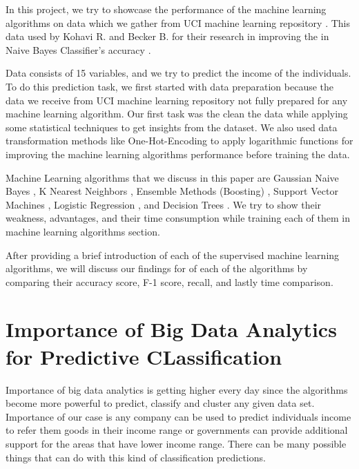 \documentclass[sigconf]{acmart}
\begin{document}
In this project, we try to showcase the performance of the machine learning algorithms on data which we gather from UCI machine learning repository \cite{www-uci}. This data used by Kohavi R. and Becker B. for their research in improving the in Naive Bayes Classifier's accuracy \cite{Kohavi:1996:SUA:3001460.3001502}. 
\par Data consists of 15 variables, and we try to predict the income of the individuals. To do this prediction task, we first started with data preparation because the data we receive from UCI machine learning repository \cite{www-uci} not fully prepared for any machine learning algorithm. Our first task was the clean the data while applying some statistical techniques to get insights from the dataset. We also used data transformation methods like One-Hot-Encoding\cite{www-hackernoon} to apply logarithmic functions for improving the machine learning algorithms performance before training the data. 
\par Machine Learning algorithms that we discuss in this paper are Gaussian Naive Bayes \cite{www-wikipedia-naivebayes}, K Nearest Neighbors \cite{Lee2017-knn}, Ensemble Methods (Boosting) \cite{dietterich-ensemble}, Support Vector Machines \cite{www-simafore-svm}, Logistic Regression \cite{adarsh}, and Decision Trees \cite{www-wikipedia.decision}. We try to show their weakness, advantages, and their time consumption while training each of them in machine learning algorithms section. 
\par After providing a brief introduction of each of the supervised machine learning algorithms, we will discuss our findings for of each of the algorithms by comparing their accuracy score, F-1 score, recall, and lastly time comparison. 


\section{Importance of Big Data Analytics for Predictive CLassification}

Importance of big data analytics is getting higher every day since the algorithms become more powerful to predict, classify and cluster any given data set. Importance of our case is any company can be used to predict individuals income to refer them goods in their income range or governments can provide additional support for the areas that have lower income range. There can be many possible things that can do with this kind of classification predictions. 
\end{document}
